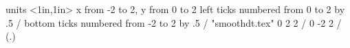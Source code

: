 \beginpicture
  \setcoordinatesystem units <1in,1in>
  \setplotarea x from -2 to 2, y from 0 to 2
  \axis left  
    ticks numbered from  0 to 2 by .5 /
  \axis bottom  
    ticks numbered from -2 to 2 by .5 /
 \setquadratic
 \plot "smoothdt.tex" 
 \setlinear
  0  2 2 /
  0 -2 2 /
 \setplotsymbol({\rm .})
\endpicture
